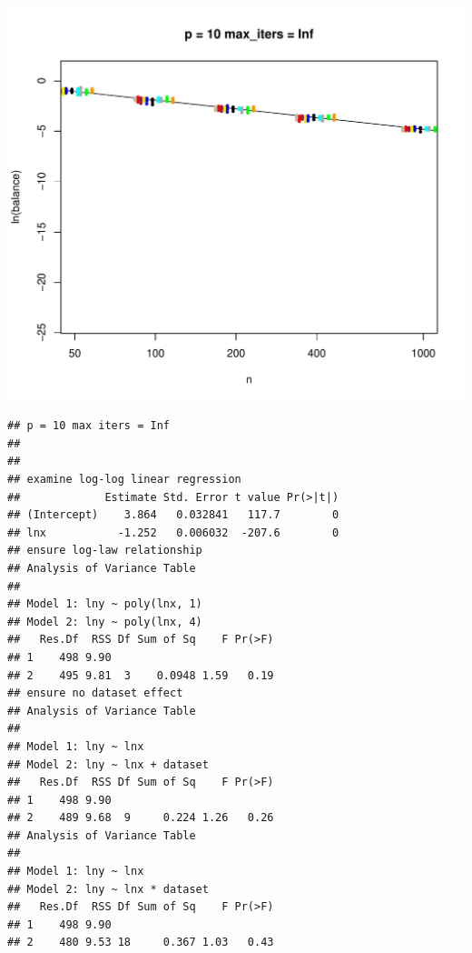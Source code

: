 \documentclass{article}\usepackage[]{graphicx}\usepackage[]{color}
\makeatletter
\def\maxwidth{ %
  \ifdim\Gin@nat@width>\linewidth
    \linewidth
  \else
    \Gin@nat@width
  \fi
}
\newenvironment{kframe}{%
 \def\at@end@of@kframe{}%
 \ifinner\ifhmode%
  \def\at@end@of@kframe{\end{minipage}}%
  \begin{minipage}{\columnwidth}%
 \fi\fi%
 \def\FrameCommand##1{\hskip\@totalleftmargin \hskip-\fboxsep
 \colorbox{shadecolor}{##1}\hskip-\fboxsep
     \hskip-\linewidth \hskip-\@totalleftmargin \hskip\columnwidth}%
 \MakeFramed {\advance\hsize-\width
   \@totalleftmargin\z@ \linewidth\hsize
   \@setminipage}}%
 {\par\unskip\endMakeFramed%
 \at@end@of@kframe}
\newenvironment{knitrout}{}{} %
\makeatother
\begin{document}
\begin{knitrout}
\begin{kframe}
\end{kframe}
\includegraphics[width=\maxwidth]{figure/load_and_cleanup_data4} 
\begin{kframe}\begin{verbatim}
## p = 10 max iters = Inf 
## 
## 
## examine log-log linear regression
##             Estimate Std. Error t value Pr(>|t|)
## (Intercept)    3.864   0.032841   117.7        0
## lnx           -1.252   0.006032  -207.6        0
## ensure log-law relationship
## Analysis of Variance Table
## 
## Model 1: lny ~ poly(lnx, 1)
## Model 2: lny ~ poly(lnx, 4)
##   Res.Df  RSS Df Sum of Sq    F Pr(>F)
## 1    498 9.90                         
## 2    495 9.81  3    0.0948 1.59   0.19
## ensure no dataset effect
## Analysis of Variance Table
## 
## Model 1: lny ~ lnx
## Model 2: lny ~ lnx + dataset
##   Res.Df  RSS Df Sum of Sq    F Pr(>F)
## 1    498 9.90                         
## 2    489 9.68  9     0.224 1.26   0.26
## Analysis of Variance Table
## 
## Model 1: lny ~ lnx
## Model 2: lny ~ lnx * dataset
##   Res.Df  RSS Df Sum of Sq    F Pr(>F)
## 1    498 9.90                         
## 2    480 9.53 18     0.367 1.03   0.43
\end{verbatim}
\end{kframe}

\end{knitrout}
\end{document}
